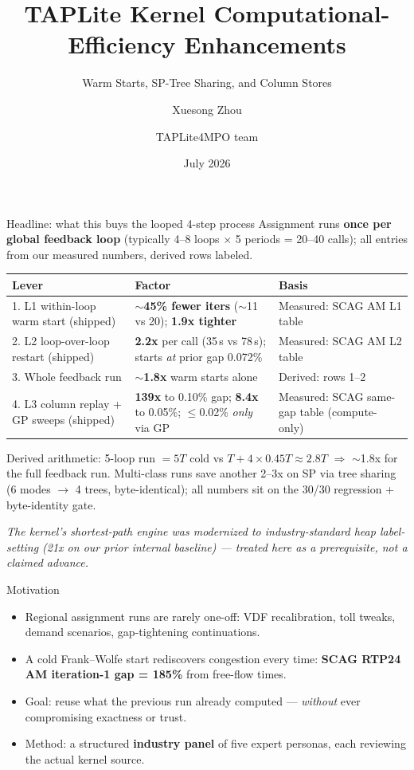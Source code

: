 \documentclass[10pt]{beamer}
\title{TAPLite Kernel Computational-Efficiency Enhancements}
\subtitle{Warm Starts, SP-Tree Sharing, and Column Stores}
\author{Xuesong Zhou \and TAPLite4MPO team}
\date{July 2026}
\begin{document}
\begin{frame}
  \titlepage
\end{frame}

\begin{frame}{Headline: what this buys the looped 4-step process}
  \footnotesize
  Assignment runs \textbf{once per global feedback loop}
  (typically 4--8 loops $\times$ 5 periods = 20--40 calls); all entries from
  our measured numbers, derived rows labeled.
  \begin{center}
  \scriptsize
  \begin{tabular}{p{}p{}p{}}
    \toprule
    Lever & Factor & Basis \\
    \midrule
    1. L1 within-loop warm start (shipped) & \textbf{$\sim$45\% fewer iters}
      ($\sim$11 vs 20); \textbf{1.9x tighter} &
      Measured: SCAG AM L1 table \\
    2. L2 loop-over-loop restart (shipped) & \textbf{2.2x} per call
      (35\,s vs 78\,s); starts \emph{at} prior gap 0.072\% &
      Measured: SCAG AM L2 table \\
    3. Whole feedback run & \textbf{$\sim$1.8x} warm starts alone &
      Derived: rows 1--2 \\
    4. L3 column replay + GP sweeps (shipped) & \textbf{139x} to 0.10\% gap;
      \textbf{8.4x} to 0.05\%; $\leq$0.02\% \emph{only} via GP &
      Measured: SCAG same-gap table (compute-only) \\
    \bottomrule
  \end{tabular}
  \end{center}
  \scriptsize
  Derived arithmetic: 5-loop run $= 5T$ cold vs
  $T + 4 \times 0.45T \approx 2.8T$ $\Rightarrow$ $\sim$1.8x for the full
  feedback run. Multi-class runs save another
  2--3x on SP via tree sharing (6 modes $\rightarrow$ 4 trees, byte-identical);
  all numbers sit on the 30/30 regression + byte-identity gate.

  \smallskip
  \emph{The kernel's shortest-path engine was modernized to industry-standard
  heap label-setting (21x on our prior internal baseline) --- treated here as
  a prerequisite, not a claimed advance.}
\end{frame}

\begin{frame}{Motivation}
  \begin{itemize}
    \item Regional assignment runs are rarely one-off: VDF recalibration,
      toll tweaks, demand scenarios, gap-tightening continuations.
    \item A cold Frank--Wolfe start rediscovers congestion every time:
      \textbf{SCAG RTP24 AM iteration-1 gap = 185\%} from free-flow times.
    \item Goal: reuse what the previous run already computed ---
      \emph{without} ever compromising exactness or trust.
    \item Method: a structured \textbf{industry panel} of five expert personas,
      each reviewing the actual kernel source.
  \end{itemize}
\end{frame}
\end{document}
